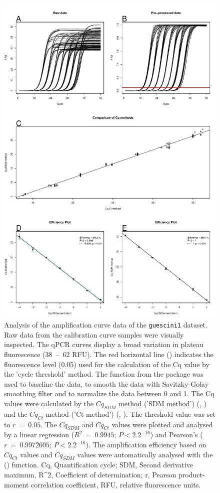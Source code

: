 \begin{figure}[htbp]
  \centering
  \includegraphics[clip=truec,trim=0.9cm 0.7cm 0.9cm 5cm, width=12cm]{figures/dilution_Cq.pdf}
  \caption{Analysis of the amplification curve data of the \texttt{guescini1} 
dataset.  Raw data from the calibration curve samples were visually 
inspected. The qPCR curves display a broad variation in plateau fluorescence 
(38~--~62 RFU). The red horizontal line (\textcolor{red}\textemdash) indicates 
the fluorescence level (0.05) used for the calculation of the Cq value by the 
'cycle threshold' method.  The  function from the 
 package was used to baseline the data, to smooth the data with 
Savitzky-Golay smoothing filter and to normalize the data between 0 and 1. 
 The Cq values were calculated by the $Cq_{SDM}$ method ('SDM 
method') (, ) and the $Cq_{Ct}$ method ('Ct 
method') (, ). The threshold value was set to 
$r~=~0.05$. The $Cq_{SDM}$ and $Cq_{Ct}$ values were plotted and analysed by a 
linear regression ($R^{2}~=~0.9945$; $P < 2.2^{-16}$) and Pearson's 
($r~=~0.9972605$; $P < 2.2^{-16}$). The amplification efficiency based on 
 $Cq_{Ct}$ values and  $Cq_{SDM}$ values were 
automatically analysed with the  () function. Cq, 
Quantification cycle; SDM, Second derivative maximum, R\textasciicircum2, 
Coefficient of determination; r, Pearson product-moment correlation 
coefficient, RFU, relative fluorescence units.}
  \label{figure:dilution_Cq}
\end{figure}

